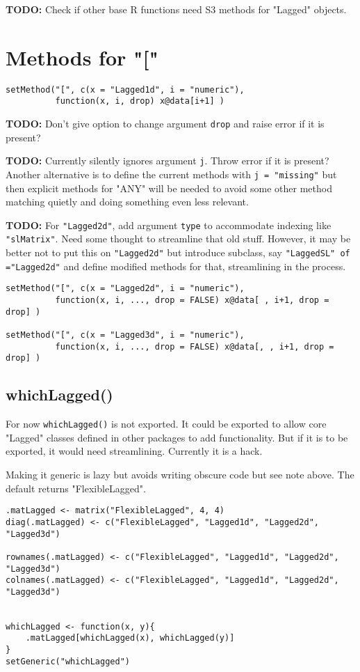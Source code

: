 \documentclass[11pt,a4paper]{article}
\begin{document}
\textbf{TODO:} Check if other base R functions need S3 methods for "Lagged" objects.




\section{Methods for "["}
\label{sec:org472d3cf}

\begin{verbatim}
setMethod("[", c(x = "Lagged1d", i = "numeric"),
          function(x, i, drop) x@data[i+1] )
\end{verbatim}


\textbf{TODO:} Don't give option to change argument \texttt{drop} and raise error if it is present?

\textbf{TODO:} Currently silently ignores argument \texttt{j}. Throw error if it is present?
    Another alternative is to define the current methods with \texttt{j = "missing"} but then
    explicit methods for "ANY" will be needed to avoid some other method matching quietly and
    doing something even less relevant.

\textbf{TODO:} For \texttt{"Lagged2d"}, add argument \texttt{type} to accommodate indexing like \texttt{"slMatrix"}.
    Need some thought to streamline that old stuff. However, it may be better not to put this on
    \texttt{"Lagged2d"} but introduce subclass, say \texttt{"LaggedSL" of ="Lagged2d"} and define modified
    methods for that, streamlining in the process.
\begin{verbatim}
setMethod("[", c(x = "Lagged2d", i = "numeric"),
          function(x, i, ..., drop = FALSE) x@data[ , i+1, drop = drop] )

setMethod("[", c(x = "Lagged3d", i = "numeric"),
          function(x, i, ..., drop = FALSE) x@data[, , i+1, drop = drop] )
\end{verbatim}

\subsection{whichLagged()}
\label{sec:org5e1ae2d}

For now \texttt{whichLagged()} is not exported. It could be exported to allow core "Lagged" classes
defined in other packages to add functionality. But if it is to be exported, it would need
streamlining. Currently it is a hack.

Making it generic is lazy but avoids writing obscure code but see note above.
The default returns "FlexibleLagged".
\begin{verbatim}
.matLagged <- matrix("FlexibleLagged", 4, 4)
diag(.matLagged) <- c("FlexibleLagged", "Lagged1d", "Lagged2d", "Lagged3d")

rownames(.matLagged) <- c("FlexibleLagged", "Lagged1d", "Lagged2d", "Lagged3d")
colnames(.matLagged) <- c("FlexibleLagged", "Lagged1d", "Lagged2d", "Lagged3d")


whichLagged <- function(x, y){
    .matLagged[whichLagged(x), whichLagged(y)]
}
setGeneric("whichLagged")
\end{verbatim}
\end{document}
